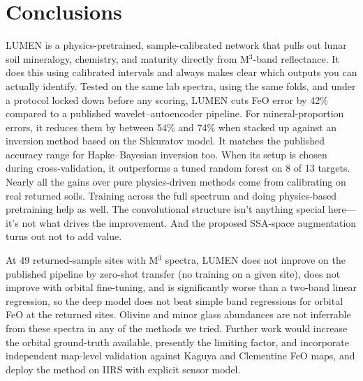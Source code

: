 \documentclass[remotesensing,article,submit,pdftex,moreauthors]{Definitions/mdpi}
\begin{document}
\section{Conclusions}

LUMEN is a physics-pretrained, sample-calibrated network that pulls out lunar soil mineralogy, chemistry, and maturity directly from M$^{3}$-band reflectance. It does this using calibrated intervals and always makes clear which outputs you can actually identify. Tested on the same lab spectra, using the same folds, and under a protocol locked down before any scoring, LUMEN cuts FeO error by 42\% compared to a published wavelet--autoencoder pipeline. For mineral-proportion errors, it reduces them by between 54\% and 74\% when stacked up against an inversion method based on the Shkuratov model. It matches the published accuracy range for Hapke--Bayesian inversion too. When its setup is chosen during cross-validation, it outperforms a tuned random forest on 8 of 13 targets. Nearly all the gains over pure physics-driven methods come from calibrating on real returned soils. Training across the full spectrum and doing physics-based pretraining help as well. The convolutional structure isn't anything special here---it's not what drives the improvement. And the proposed SSA-space augmentation turns out not to add value.

At 49 returned-sample sites with M$^{3}$ spectra, LUMEN does not improve on the published pipeline by zero-shot transfer (no training on a given site), does not improve with orbital fine-tuning, and is significantly worse than a two-band linear regression, so the deep model does not beat simple band regressions for orbital FeO at the returned sites. Olivine and minor glass abundances are not inferrable from these spectra in any of the methods we tried. Further work would increase the orbital ground-truth available, presently the limiting factor, and incorporate independent map-level validation against Kaguya and Clementine FeO maps, and deploy the method on IIRS with explicit sensor model.


\vspace{6pt}

\authorcontributions{}
\funding{}
\conflictsofinterest{}
\end{document}
